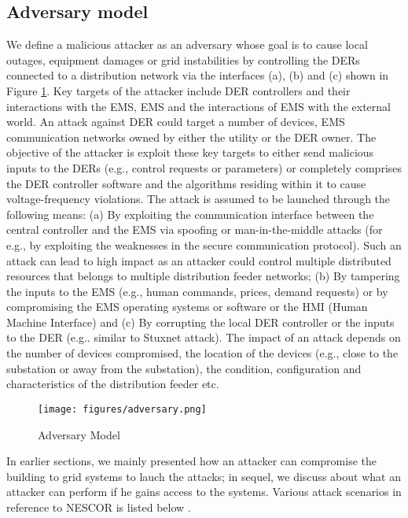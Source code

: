 \documentclass[conference]{IEEEtran}
\begin{document}
\subsection{Adversary model} We define a malicious attacker as an adversary whose goal is to cause local outages, equipment damages or grid instabilities by controlling the DERs connected to a distribution network via the interfaces (a), (b) and (c) shown in Figure \ref{ad}. Key targets of the attacker include DER controllers and their interactions with the EMS, EMS and the interactions of EMS with the external world. An attack against DER could target a number of devices, EMS
communication networks owned by either the utility or the DER owner. The objective of the attacker is exploit these key targets to either send malicious inputs to the DERs (e.g., control requests or parameters) or completely comprises the DER controller software and the algorithms residing within it to cause voltage-frequency violations. The attack is assumed to be launched through the following means: (a) By exploiting the communication interface between the central controller and the EMS via spoofing or man-in-the-middle attacks (for e.g., by exploiting the weaknesses in the secure communication protocol). Such an attack can lead to high impact as an attacker could control multiple distributed resources that belongs to multiple distribution feeder networks; (b) By tampering the inputs to the EMS (e.g., human commands, prices, demand requests) or by compromising the EMS operating systems or software or the HMI (Human Machine Interface) and (c) By corrupting the local DER controller or the inputs to the DER  (e.g.. similar to Stuxnet attack). The impact of an attack depends on the number of devices compromised, the location of the devices (e.g., close to the substation or away from the substation), the condition, configuration and characteristics of the distribution feeder etc.  
%
\begin{figure}
	\centering
	\texttt{[image: figures/adversary.png]}
	\caption{Adversary Model}
	\label{ad}
\end{figure}

In earlier sections, we mainly presented how an attacker can compromise the building to grid systems to lauch the attacks; in sequel, we discuss about what an attacker can perform if he gains access to the systems. Various attack scenarios in reference to NESCOR is listed below \cite{Lee:NESCOR2013}. 
\end{document}
